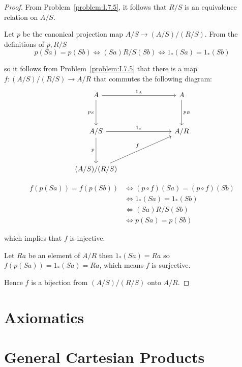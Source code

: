 \begin{proof}
	From Problem~\ref{problem:I.7.5}, it follows that \( R/S \) is an equivalence relation on \( A/S \).

	Let \( p \) be the canonical projection map \( A/S \to (A/S)/(R/S) \). From the definitions of \(p, R/S\)
	\[
		p(Sa) = p(Sb) \iff (Sa) R/S (Sb) \iff 1_{\ast}(Sa) = 1_{\ast}(Sb)
	\]

	so it follows from Problem~\ref{problem:I.7.5} that there is a map \( f: (A/S)/(R/S) \to A/R \) that commutes the following diagram:
	\[
		\begin{tikzcd}
			A &&& A \\
			\\
			{A/S} &&& {A/R} \\
			\\
			{(A/S)/(R/S)}
			\arrow["{1_{A}}", from=1-1, to=1-4]
			\arrow["{p_{S}}"', from=1-1, to=3-1]
			\arrow["{p_{R}}", from=1-4, to=3-4]
			\arrow["{1_{\ast}}", from=3-1, to=3-4]
			\arrow["p"', from=3-1, to=5-1]
			\arrow["f", from=5-1, to=3-4]
		\end{tikzcd}
	\]

	\begingroup
	\allowdisplaybreaks%
	\begin{align*}
		f(p(Sa)) = f(p(Sb)) & \iff (p \circ f)(Sa) = (p\circ f)(Sb) \\
		                    & \iff 1_{\ast}(Sa) = 1_{\ast}(Sb)      \\
		                    & \iff (Sa) R/S (Sb)                    \\
		                    & \iff p(Sa) = p(Sb)
	\end{align*}
	\endgroup

	which implies that \( f \) is injective.

	Let \( Ra \) be an element of \( A/R \) then \( 1_{\ast}(Sa) = Ra \) so \( f(p(Sa)) = 1_{\ast}(Sa) = Ra \), which means \( f \) is surjective.

	Hence \( f \) is a bijection from \( (A/S)/(R/S) \) onto \( A/R \).
\end{proof}

\section{Axiomatics}

\section{General Cartesian Products}

